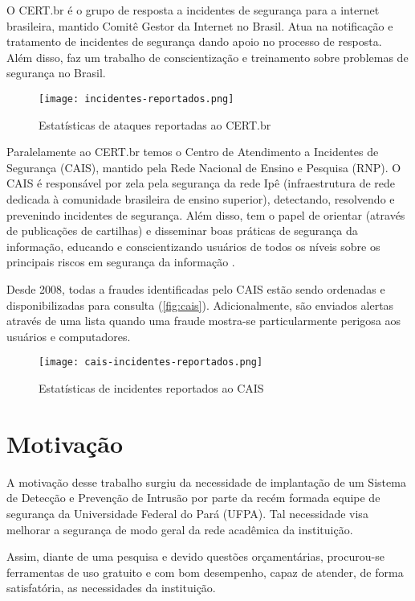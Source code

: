 O CERT.br é o grupo de resposta a incidentes de segurança para a internet brasileira, mantido Comitê Gestor da Internet no Brasil. Atua na notificação e tratamento de incidentes de segurança dando apoio no processo de resposta. Além disso, faz um trabalho de conscientização e treinamento sobre problemas de segurança no Brasil. 

\begin{figure}[!htb]
 \centering
 \caption{Estatísticas de ataques reportadas ao CERT.br}
 \texttt{[image: incidentes-reportados.png]}
 \label{fig:cert}
\end{figure}

Paralelamente ao CERT.br temos o Centro de Atendimento a Incidentes de Segurança (CAIS), mantido pela Rede Nacional de Ensino e Pesquisa (RNP). O CAIS é responsável por zela pela segurança da rede Ipê (infraestrutura de rede dedicada à comunidade brasileira de ensino superior), detectando, resolvendo e prevenindo incidentes de segurança. Além disso, tem o papel de orientar (através de publicações de cartilhas) e disseminar boas práticas de segurança da informação, educando e conscientizando usuários de todos os níveis sobre os principais riscos em segurança da informação \cite{cais}.

Desde 2008, todas a fraudes identificadas pelo CAIS estão sendo ordenadas e disponibilizadas para consulta (\autoref{fig:cais}). Adicionalmente, são enviados alertas através de uma lista quando uma fraude mostra-se particularmente perigosa aos usuários e computadores.

\begin{figure}[!htb]
 \centering
 \caption{Estatísticas de incidentes reportados ao CAIS}
 \texttt{[image: cais-incidentes-reportados.png]}
 \label{fig:cais}
\end{figure}

\section{Motivação} \label{sec:motivação} 

A motivação desse trabalho surgiu da necessidade de implantação de um Sistema de Detecção e Prevenção de Intrusão por parte da recém formada equipe de segurança da Universidade Federal do Pará (UFPA). Tal necessidade visa melhorar a segurança de modo geral da rede acadêmica da instituição. 

Assim, diante de uma pesquisa e devido questões orçamentárias, procurou-se ferramentas de uso gratuito e com bom desempenho, capaz de atender, de forma satisfatória, as necessidades da instituição. 

